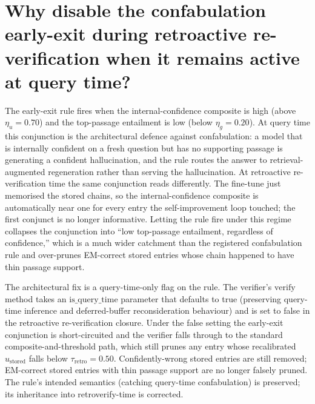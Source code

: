 
\section[Early-exit disabled at retro-verify]{Why disable the confabulation early-exit during retroactive re-verification when it remains active at query time?}
\label{app:qa-early-exit-retro}

The early-exit rule fires when the internal-confidence composite is high (above $\eta_u = 0.70$) and the top-passage entailment is low (below $\eta_g = 0.20$). At query time this conjunction is the architectural defence against confabulation: a model that is internally confident on a fresh question but has no supporting passage is generating a confident hallucination, and the rule routes the answer to retrieval-augmented regeneration rather than serving the hallucination. At retroactive re-verification time the same conjunction reads differently. The fine-tune just memorised the stored chains, so the internal-confidence composite is automatically near one for every entry the self-improvement loop touched; the first conjunct is no longer informative. Letting the rule fire under this regime collapses the conjunction into ``low top-passage entailment, regardless of confidence,'' which is a much wider catchment than the registered confabulation rule and over-prunes EM-correct stored entries whose chain happened to have thin passage support.

The architectural fix is a query-time-only flag on the rule. The verifier's $\mathrm{verify}$ method takes an $\mathrm{is\_query\_time}$ parameter that defaults to true (preserving query-time inference and deferred-buffer reconsideration behaviour) and is set to false in the retroactive re-verification closure. Under the false setting the early-exit conjunction is short-circuited and the verifier falls through to the standard composite-and-threshold path, which still prunes any entry whose recalibrated $u_{\text{stored}}$ falls below $\tau_{\text{retro}} = 0.50$. Confidently-wrong stored entries are still removed; EM-correct stored entries with thin passage support are no longer falsely pruned. The rule's intended semantics (catching query-time confabulation) is preserved; its inheritance into retroverify-time is corrected.


